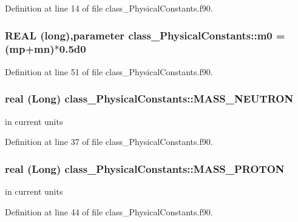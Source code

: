 Definition at line 14 of file class\_\-PhysicalConstants.f90.

\hypertarget{namespaceclass__PhysicalConstants_a6a2b98e5cc0028b726afab655255b5c8}{
\subsubsection[{m0}]{\setlength{\rightskip}{0pt plus 5cm}REAL (long),parameter {\bf class\_\-PhysicalConstants::m0} = ({\bf mp}+{\bf mn})$\ast$0.5d0}}
\label{namespaceclass__PhysicalConstants_a6a2b98e5cc0028b726afab655255b5c8}


Definition at line 51 of file class\_\-PhysicalConstants.f90.

\hypertarget{namespaceclass__PhysicalConstants_af0ecc86a3048c06a15619a67d8a21687}{
\subsubsection[{MASS\_\-NEUTRON}]{\setlength{\rightskip}{0pt plus 5cm}real (Long) {\bf class\_\-PhysicalConstants::MASS\_\-NEUTRON}}}
\label{namespaceclass__PhysicalConstants_af0ecc86a3048c06a15619a67d8a21687}


in current units 



Definition at line 37 of file class\_\-PhysicalConstants.f90.

\hypertarget{namespaceclass__PhysicalConstants_a91ea21ef8a0bb29bf99b041c512b6859}{
\subsubsection[{MASS\_\-PROTON}]{\setlength{\rightskip}{0pt plus 5cm}real (Long) {\bf class\_\-PhysicalConstants::MASS\_\-PROTON}}}
\label{namespaceclass__PhysicalConstants_a91ea21ef8a0bb29bf99b041c512b6859}


in current units 



Definition at line 44 of file class\_\-PhysicalConstants.f90.

